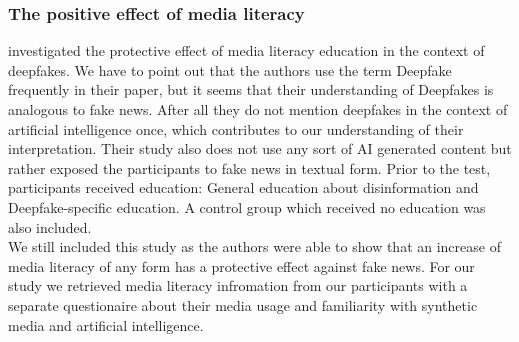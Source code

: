 \documentclass[
  a4paper,  %
  twoside,  %
  bibliography=totoc,
  headsepline,
  cleardoublepage=empty,
  parskip=half,
  draft=false
]{scrbook}
\begin{document}
\subsubsection*{The positive effect of media literacy}
\citeauthor{hwangEffectsDisinformationUsing2021} investigated the protective effect of media literacy education in the context of deepfakes. We have to point out that the authors use the term Deepfake frequently in their paper, but it seems that their understanding of Deepfakes is analogous to fake news. After all they do not mention deepfakes in the context of artificial intelligence once, which contributes to our understanding of their interpretation. Their study also does not use any sort of AI generated content but rather exposed the participants to fake news in textual form. Prior to the test, participants received education: General education about disinformation and Deepfake-specific education. A control group which received no education was also included. \\
We still included this study as the authors were able to show that an increase of media literacy of any form has a protective effect against fake news. For our study we retrieved media literacy infromation from our participants with a separate questionaire about their media usage and familiarity with synthetic media and artificial intelligence.
\end{document}
